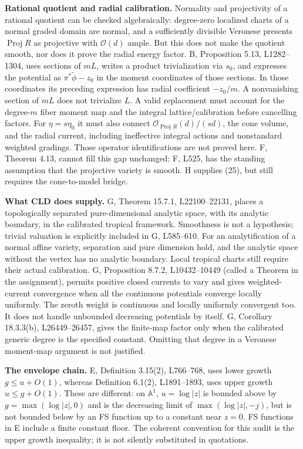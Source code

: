 \documentclass[
  11pt,
]{article}
\begin{document}
\textbf{Rational quotient and radial calibration.} Normality and
projectivity of a rational quotient can be checked algebraically:
degree-zero localized charts of a normal graded domain are normal, and a
sufficiently divisible Veronese presents \(\operatorname{Proj}R\) as
projective with \(\mathcal O(d)\) ample. But this does not make the
quotient smooth, nor does it prove the radial energy factor. B,
Proposition 5.13, L1282--1304, uses sections of \(mL\), writes a product
trivialization via \(s_0\), and expresses the potential as
\(\pi^*\widetilde\phi-z_0\) in the moment coordinates of those sections.
In those coordinates its preceding expression has radial coefficient
\(-z_0/m\). A nonvanishing section of \(mL\) does not trivialize \(L\).
A valid replacement must account for the degree-\(m\) fiber moment map
and the integral lattice/calibration before cancelling factors. For
\(\eta=s\eta_0\) it must also connect
\(\mathcal O_{\operatorname{Proj}R}(d)/(sd)\), the cone volume, and the
radial current, including ineffective integral actions and nonstandard
weighted gradings. Those operator identifications are not proved here.
F, Theorem 4.13, cannot fill this gap unchanged: F, L525, has the
standing assumption that the projective variety is smooth. H supplies
(25), but still requires the cone-to-model bridge.

\textbf{What CLD does supply.} G, Theorem 15.7.1, L22100--22131, places
a topologically separated pure-dimensional analytic space, with its
analytic boundary, in the calibrated tropical framework. Smoothness is
not a hypothesis; trivial valuation is explicitly included in G,
L585--610. For an analytification of a normal affine variety, separation
and pure dimension hold, and the analytic space without the vertex has
no analytic boundary. Local tropical charts still require their actual
calibration. G, Proposition 8.7.2, L10432--10449 (called a Theorem in
the assignment), permits positive closed currents to vary and gives
weighted-current convergence when all the continuous potentials converge
locally uniformly. The zeroth weight is continuous and locally uniformly
convergent too. It does not handle unbounded decreasing potentials by
itself. G, Corollary 18.3.3(b), L26449--26457, gives the finite-map
factor only when the calibrated generic degree is the specified
constant. Omitting that degree in a Veronese moment-map argument is not
justified.

\textbf{The envelope chain.} E, Definition 3.15(2), L766--768, uses
lower growth \(g\leq u+O(1)\), whereas Definition 6.1(2), L1891--1893,
uses upper growth \(u\leq g+O(1)\). These are different: on
\(\mathbb A^1\), \(u=\log|z|\) is bounded above by \(g=\max(\log|z|,0)\)
and is the decreasing limit of \(\max(\log|z|,-j)\), but is not bounded
below by an FS function up to a constant near \(z=0\). FS functions in E
include a finite constant floor. The coherent convention for this audit
is the upper growth inequality; it is not silently substituted in
quotations.
\end{document}
